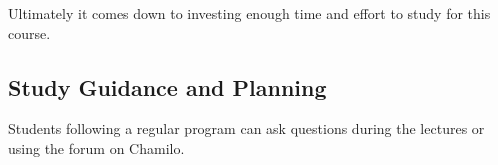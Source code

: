 Ultimately it comes down to investing enough time and effort to study for this course.

\subsection{Study Guidance and Planning}

Students following a regular program can ask questions during the lectures or using the forum on Chamilo.



